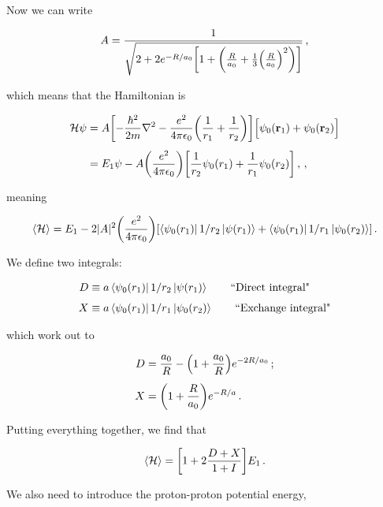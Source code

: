 \documentclass[12pt, titlepage]{article}
\newcommand{\exv}[1]{\left\langle #1 \right\rangle}
\begin{document}
Now we can write

\begin{equation}
	A = \frac{1}{\sqrt{2 + 2e^{-R/a_0}\qty[1 + \qty(\frac{R}{a_0} + \frac{1}{3}\qty(\frac{R}{a_0})^2)]}} \,,
\end{equation}

which means that the Hamiltonian is

\begin{align}
	\mathcal{H}\psi &= A\qty[-\frac{\hbar^2}{2m}\laplacian{} - \frac{e^2}{4\pi\epsilon_0}\qty(\frac{1}{r_1} + \frac{1}{r_2})]\Bigl[\psi_0(\vb{r}_1) + \psi_0(\vb{r}_2)\Bigr] \nonumber \\[4pt] 
	&= E_1\psi - A\qty(\frac{e^2}{4\pi\epsilon_0})\qty[\frac{1}{r_2}\psi_0(r_1) + \frac{1}{r_1}\psi_0(r_2)] \,,
	\,,
\end{align}

meaning

\begin{equation}
	\exv{\mathcal{H}} = E_1 - 2|A|^2\qty(\frac{e^2}{4\pi\epsilon_0})\qty[\bra{\psi_0(r_1)}1/r_2\ket{\psi(r_1)} + \bra{\psi_0(r_1)}1/r_1\ket{\psi_0(r_2)}] \,.
\end{equation}

We define two integrals:

\begin{subequations}
\begin{align}
	D &\equiv a\bra{\psi_0(r_1)}1/r_2\ket{\psi(r_1)} \qquad\text{``Direct integral"} \\[4pt]
	X &\equiv a\bra{\psi_0(r_1)}1/r_1\ket{\psi_0(r_2)} \qquad\text{``Exchange integral"}
\end{align}
\end{subequations}

which work out to

\begin{subequations}
	\begin{align}
	D &= \frac{a_0}{R} - \qty(1 + \frac{a_0}{R})e^{-2R/a_0} \,; \\[4pt]
	X &= \qty(1 + \frac{R}{a_0})e^{-R/a} \,.
	\end{align}
\end{subequations}

Putting everything together, we find that 

\begin{equation}
	\exv{\mathcal{H}} = \qty[1 + 2\frac{D+X}{1+I}]E_1 \,.
\end{equation}

We also need to introduce the proton-proton potential energy,
\end{document}
